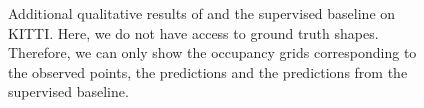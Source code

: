 \begin{figure}

  \caption{Additional qualitative results of \AML and the supervised baseline on KITTI.
  Here, we do not have access to ground truth shapes. Therefore, we can only show the occupancy
  grids corresponding to the observed points, the \AML predictions and the predictions from
  the supervised baseline.}
  \vspace*{-0.5cm}
  \label{fig:appendix-experiments-kitti-aml-2}
\end{figure}
